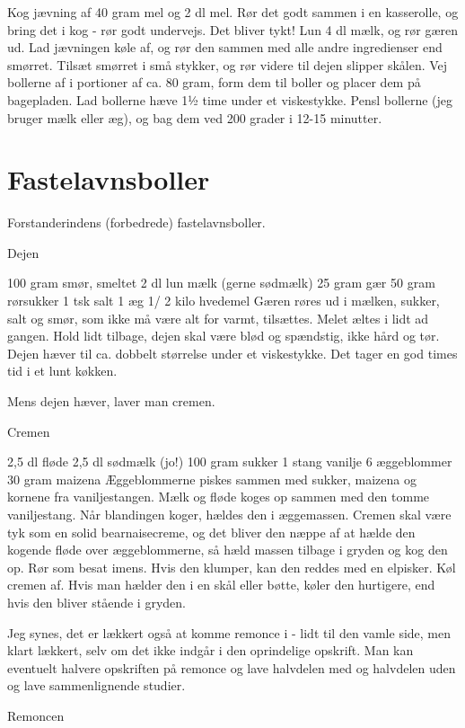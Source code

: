 \documentclass[
  letterpaper,
  DIV=11,
  numbers=noendperiod]{scrreprt}
\begin{document}
Kog jævning af 40 gram mel og 2 dl mel. Rør det godt sammen i en
kasserolle, og bring det i kog - rør godt undervejs. Det bliver tykt!
Lun 4 dl mælk, og rør gæren ud. Lad jævningen køle af, og rør den sammen
med alle andre ingredienser end smørret. Tilsæt smørret i små stykker,
og rør videre til dejen slipper skålen. Vej bollerne af i portioner af
ca. 80 gram, form dem til boller og placer dem på bagepladen. Lad
bollerne hæve 1½ time under et viskestykke. Pensl bollerne (jeg bruger
mælk eller æg), og bag dem ved 200 grader i 12-15 minutter.

\hypertarget{fastelavnsboller-1}{%
\section{Fastelavnsboller}\label{fastelavnsboller-1}}

Forstanderindens (forbedrede) fastelavnsboller.

Dejen

100 gram smør, smeltet 2 dl lun mælk (gerne sødmælk) 25 gram gær 50 gram
rørsukker 1 tsk salt 1 æg 1/ 2 kilo hvedemel Gæren røres ud i mælken,
sukker, salt og smør, som ikke må være alt for varmt, tilsættes. Melet
æltes i lidt ad gangen. Hold lidt tilbage, dejen skal være blød og
spændstig, ikke hård og tør. Dejen hæver til ca. dobbelt størrelse under
et viskestykke. Det tager en god times tid i et lunt køkken.

Mens dejen hæver, laver man cremen.

Cremen

2,5 dl fløde 2,5 dl sødmælk (jo!) 100 gram sukker 1 stang vanilje 6
æggeblommer 30 gram maizena Æggeblommerne piskes sammen med sukker,
maizena og kornene fra vaniljestangen. Mælk og fløde koges op sammen med
den tomme vaniljestang. Når blandingen koger, hældes den i æggemassen.
Cremen skal være tyk som en solid bearnaisecreme, og det bliver den
næppe af at hælde den kogende fløde over æggeblommerne, så hæld massen
tilbage i gryden og kog den op. Rør som besat imens. Hvis den klumper,
kan den reddes med en elpisker. Køl cremen af. Hvis man hælder den i en
skål eller bøtte, køler den hurtigere, end hvis den bliver stående i
gryden.

Jeg synes, det er lækkert også at komme remonce i - lidt til den vamle
side, men klart lækkert, selv om det ikke indgår i den oprindelige
opskrift. Man kan eventuelt halvere opskriften på remonce og lave
halvdelen med og halvdelen uden og lave sammenlignende studier.

Remoncen
\end{document}
